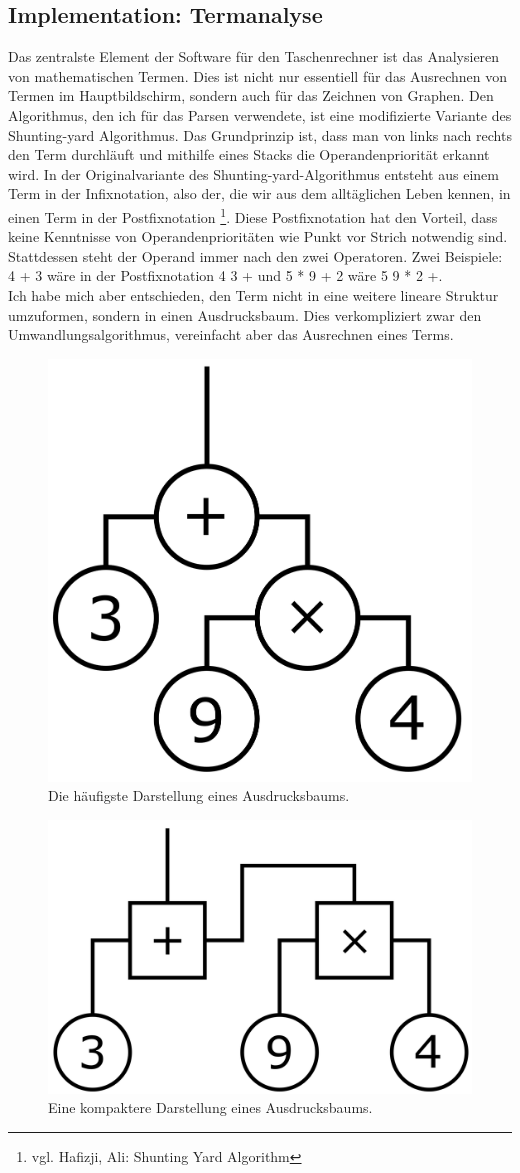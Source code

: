 \documentclass[12pt, a4paper]{report}
\begin{document}
\subsection{Implementation: Termanalyse}
Das zentralste Element der Software für den Taschenrechner ist das Analysieren von mathematischen Termen. Dies ist nicht nur essentiell für das Ausrechnen von Termen im Hauptbildschirm, sondern auch für das Zeichnen von Graphen. Den Algorithmus, den ich für das Parsen verwendete, ist eine modifizierte Variante des Shunting-yard Algorithmus. Das Grundprinzip ist, dass man von links nach rechts den Term durchläuft und mithilfe eines Stacks die Operandenpriorität erkannt wird. In der Originalvariante des Shunting-yard-Algorithmus entsteht aus einem Term in der Infixnotation, also der, die wir aus dem alltäglichen Leben kennen, in einen Term in der Postfixnotation \footnote{vgl. Hafizji, Ali: Shunting Yard Algorithm}. Diese Postfixnotation hat den Vorteil, dass keine Kenntnisse von Operandenprioritäten wie Punkt vor Strich notwendig sind. Stattdessen steht der Operand immer nach den zwei Operatoren. Zwei Beispiele:
\\[\medskipamount]
\textsf{4 + 3} wäre in der Postfixnotation \textsf{4 3 +} und \textsf{5 * 9 + 2} wäre \textsf{5 9 * 2 +}.
\\[\medskipamount]
Ich habe mich aber entschieden, den Term nicht in eine weitere lineare Struktur umzuformen, sondern in einen Ausdrucksbaum. Dies verkompliziert zwar den Umwandlungsalgorithmus, vereinfacht aber das Ausrechnen eines Terms.
\\
\begin{figure}[H]
	\centering
	\includegraphics[width=0.2\linewidth]{assets/exprtree1.png}
	\caption{Die häufigste Darstellung eines Ausdrucksbaums.}
	\label{fig:exprtreecommon}
\end{figure}
\begin{figure}[H]
	\centering
	\includegraphics[width=0.2\linewidth]{assets/exprtree2.png}
	\caption{Eine kompaktere Darstellung eines Ausdrucksbaums.}
	\label{fig:exprtreeown}
\end{figure}
\end{document}
